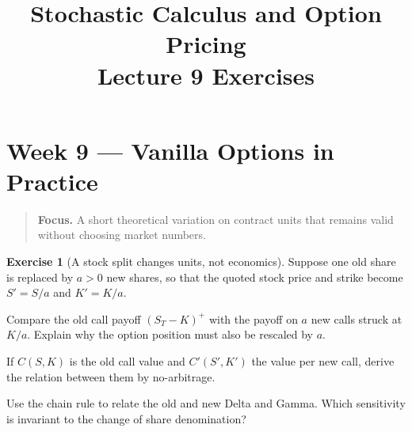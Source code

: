 \documentclass[11pt]{article}
\title{Stochastic Calculus and Option Pricing\\Lecture 9 Exercises}
\author{}
\date{}
\theoremstyle{definition}
\newtheorem{exercise}{Exercise}[section]
\newcommand{\lecturesummary}[1]{\begin{quote}\small\textbf{Focus.} #1\end{quote}}
\begin{document}
\maketitle
\vspace{-1.2em}
\setcounter{section}{8}
\fi

\section{Week 9 --- Vanilla Options in Practice}
\lecturesummary{A short theoretical variation on contract units that
remains valid without choosing market numbers.}

\begin{exercise}[A stock split changes units, not economics]
Suppose one old share is replaced by \(a>0\) new shares, so that the quoted
stock price and strike become \(S'=S/a\) and \(K'=K/a\).
\begin{exparts}
  \item Compare the old call payoff \((S_T-K)^+\) with the payoff on \(a\)
  new calls struck at \(K/a\). Explain why the option position must also be
  rescaled by \(a\).
  \item If \(C(S,K)\) is the old call value and \(C'(S',K')\) the value per
  new call, derive the relation between them by no-arbitrage.
  \item Use the chain rule to relate the old and new Delta and Gamma. Which
  sensitivity is invariant to the change of share denomination?
\end{exparts}
\end{exercise}


\ifdefined\ExercisesSynthesis\else
\end{document}
